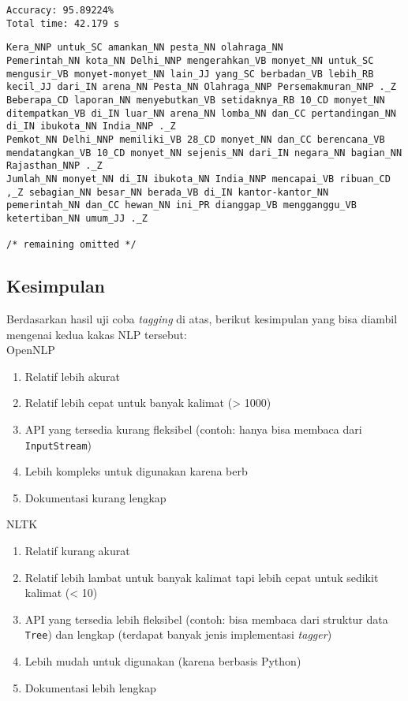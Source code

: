 \documentclass[paper=a4, fontsize=11pt]{scrartcl} %
\numberwithin{equation}{section} %
\numberwithin{figure}{section} %
\numberwithin{table}{section} %
\begin{document}
\begin{lstlisting}
Accuracy: 95.89224%
Total time: 42.179 s
\end{lstlisting}

\begin{lstlisting}[caption={sentences.tag},label={lst:sentencestagopennlp}]
Kera_NNP untuk_SC amankan_NN pesta_NN olahraga_NN
Pemerintah_NN kota_NN Delhi_NNP mengerahkan_VB monyet_NN untuk_SC mengusir_VB monyet-monyet_NN lain_JJ yang_SC berbadan_VB lebih_RB kecil_JJ dari_IN arena_NN Pesta_NN Olahraga_NNP Persemakmuran_NNP ._Z
Beberapa_CD laporan_NN menyebutkan_VB setidaknya_RB 10_CD monyet_NN ditempatkan_VB di_IN luar_NN arena_NN lomba_NN dan_CC pertandingan_NN di_IN ibukota_NN India_NNP ._Z
Pemkot_NN Delhi_NNP memiliki_VB 28_CD monyet_NN dan_CC berencana_VB mendatangkan_VB 10_CD monyet_NN sejenis_NN dari_IN negara_NN bagian_NN Rajasthan_NNP ._Z
Jumlah_NN monyet_NN di_IN ibukota_NN India_NNP mencapai_VB ribuan_CD ,_Z sebagian_NN besar_NN berada_VB di_IN kantor-kantor_NN pemerintah_NN dan_CC hewan_NN ini_PR dianggap_VB mengganggu_VB ketertiban_NN umum_JJ ._Z

/* remaining omitted */
\end{lstlisting}

\subsection{Kesimpulan}

Berdasarkan hasil uji coba \textit{tagging} di atas, berikut kesimpulan yang bisa diambil mengenai kedua kakas NLP tersebut: \\

OpenNLP
\begin{enumerate}
	\item Relatif lebih akurat
	\item Relatif lebih cepat untuk banyak kalimat (> 1000)
	\item API yang tersedia kurang fleksibel (contoh: hanya bisa membaca dari \verb|InputStream|)
	\item Lebih kompleks untuk digunakan karena berb
	\item Dokumentasi kurang lengkap
\end{enumerate}

NLTK
\begin{enumerate}
	\item Relatif kurang akurat
	\item Relatif lebih lambat untuk banyak kalimat tapi lebih cepat untuk sedikit kalimat (< 10)
	\item API yang tersedia lebih fleksibel (contoh: bisa membaca dari struktur data \verb|Tree|) dan lengkap (terdapat banyak jenis implementasi \textit{tagger})
	\item Lebih mudah untuk digunakan (karena berbasis Python)
	\item Dokumentasi lebih lengkap
\end{enumerate}
\end{document}
